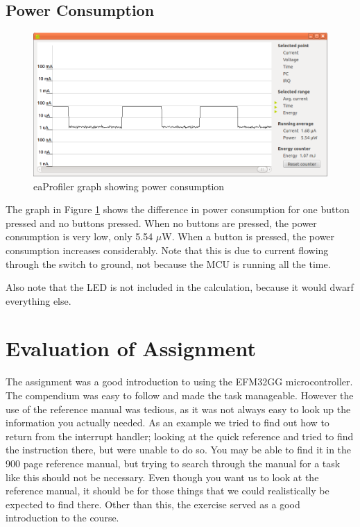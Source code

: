 \documentclass[a4paper, 12pt]{article}
\begin{document}
	\subsection{Power Consumption} %
	\label{sub:power_consumption}
		\begin{figure}[!ht]
        \includegraphics[width=\textwidth]{eaprofiler}
        \caption{eaProfiler graph showing power consumption}
        \label{fig:profiler}
        \end{figure}
        The graph in Figure \ref{fig:profiler} shows the difference in power consumption for one button pressed and no buttons pressed. When no buttons are pressed, the power consumption is very low, only 5.54 $\mu$W. When a button is pressed, the power consumption increases considerably. Note that this is due to current flowing through the switch to ground, not because the MCU is running all the time.

        Also note that the LED is not included in the calculation, because it would dwarf everything else.

\section{Evaluation of Assignment} %
\label{sec:evaluation_of_assignment}
	The assignment was a good introduction to using the EFM32GG microcontroller. The compendium was easy to follow and made the task manageable. However the use of the reference manual was tedious, as it was not always easy to look up the information you actually needed. As an example we tried to find out how to return from the interrupt handler; looking at the quick reference and tried to find the instruction there, but were unable to do so. You may be able to find it in the 900 page reference manual, but trying to search through the manual for a task like this should not be necessary. Even though you want us to look at the reference manual, it should be for those things that we could realistically be expected to find there. Other than this, the exercise served as a good introduction to the course.
\end{document}
